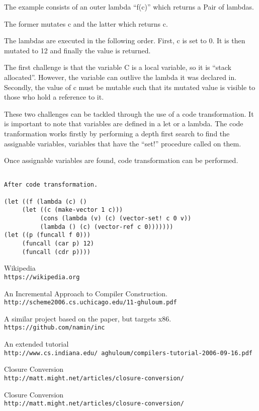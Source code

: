 \documentclass{article}
\begin{document}
The example consists of an outer lambda ``f(c)'' which returns a Pair of lambdas.

The former mutates c and the latter which returns c.

The lambdas are executed in the following order. First, c is set to 0. It is then mutated to 12 and finally the value is returned.

The first challenge is that the variable C is a local variable, so it is ``stack allocated''. However, the variable can outlive the lambda it was declared in. Secondly, the value of c must be mutable such that its mutated value is visible to those who hold a reference to it.

These two challenges can be tackled through the use of a code transformation. It is important to note that variables are defined in a let or a lambda. The code tranformation works firstly by performing a depth first search to find the assignable variables, variables that have the ``set!'' procedure called on them.



Once assignable variables are found, code transformation can be performed. 

\begin{verbatim}

After code transformation. 

(let ((f (lambda (c) ()
     (let ((c (make-vector 1 c)))
     	  (cons (lambda (v) (c) (vector-set! c 0 v))
	  	  (lambda () (c) (vector-ref c 0)))))))
(let ((p (funcall f 0)))
     (funcall (car p) 12)
     (funcall (cdr p))))

\end{verbatim}

\begin{thebibliography}{5}

Wikipedia
\\\texttt{https://wikipedia.org}

An Incremental Approach to Compiler Construction.
\\\texttt{http://scheme2006.cs.uchicago.edu/11-ghuloum.pdf}

A similar project based on the paper, but targets x86.
\\\texttt{https://github.com/namin/inc}

An extended tutorial 
\\\texttt{http://www.cs.indiana.edu/~aghuloum/compilers-tutorial-2006-09-16.pdf}

Closure Conversion
\\\texttt{http://matt.might.net/articles/closure-conversion/}

Closure Conversion
\\\texttt{http://matt.might.net/articles/closure-conversion/}

\end{thebibliography}  
\end{document}
